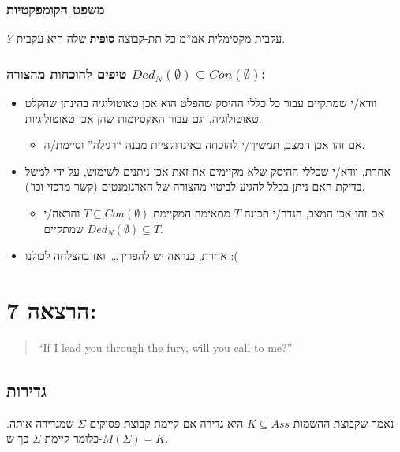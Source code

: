 \documentclass[12pt,a4paper]{article}
\begin{document}
\subsubsection*{משפט הקומפקטיות}

$Y$ עקבית מקסימלית אמ''מ כל תת-קבוצה \textbf{סופית} שלה היא עקבית.

\subsubsection*{טיפים להוכחות מהצורה $Ded_{N}(\emptyset)\subseteq Con(\emptyset)$:}

\begin{itemize}
  \item וודא/י שמתקיים עבור כל כללי ההיסק שהפלט הוא אכן טאוטולוגיה בהינתן שהקלט טאוטולוגיה, וגם עבור האקסיומות שהן אכן טאוטולוגיות.
  \begin{itemize}
    \item אם זהו אכן המצב, תמשיך/י להוכחה באינדוקציית מבנה ``רגילה'' וסיימת/ה.
  \end{itemize}
  \item אחרת, וודא/י שכללי ההיסק שלא מקיימים את זאת אכן ניתנים לשימוש, על ידי למשל בדיקת האם ניתן בכלל להגיע לביטוי מהצורה של הארגומנטים (קשר מרכזי וכו').
  \begin{itemize}
    \item אם זהו אכן המצב, הגדר/י תכונה $T$ מתאימה המקיימת $T\subseteq Con(\emptyset)$ והראה/י שמתקיים $Ded_{N}(\emptyset)\subseteq T$.
  \end{itemize}
  \item אחרת, כנראה יש להפריך\ldots\ ואז בהצלחה לכולנו :(
\end{itemize}

\section*{הרצאה 7:}

\begin{quote}
\textenglish{``If I lead you through the fury, will you call to me?''}
\end{quote}

\subsection*{גדירות}

נאמר שקבוצת ההשמות $K\subseteq Ass$ היא גדירה אם קיימת קבוצת פסוקים $\Sigma$ שמגדירה אותה. כלומר קיימת $\Sigma$ כך ש-$M(\Sigma)=K$.
\end{document}
